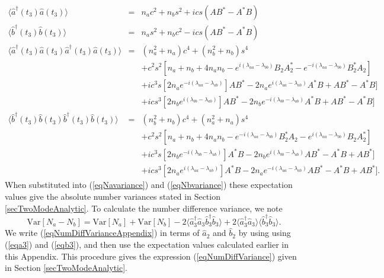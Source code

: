 \documentclass{iopart}
\begin{document}
\begin{eqnarray}
\langle \hat{a}^{\dagger}(t_3) \hat{a}(t_3) \rangle &=& n_a c^2 + n_b s^2 + i c s (A B^* - A^* B) \\
%
\langle \hat{b}^{\dagger}(t_3) \hat{b}(t_3) \rangle &=& n_a s^2 + n_b c^2 - i c s (A B^* - A^* B) \\
%
\langle \hat{a}^{\dagger}(t_3) \hat{a}(t_3) \hat{a}^{\dagger}(t_3)  \hat{a}(t_3) \rangle &=& (n_a^2 + n_a) c^4 + (n_b^2 + n_b) s^4 \nonumber \\
&& + c^2 s^2 [n_a +n_b +4 n_a n_b - e^{i(\lambda_{aa}-\lambda_{bb})} B_2 A_2^* - e^{-i(\lambda_{aa}-\lambda_{bb})} B_2^* A_2] \nonumber \\
&& + i c^3 s [2 n_a e^{-i(\lambda_{aa}-\lambda_{ab})}] A B^* - 2 n_a e^{i(\lambda_{aa}-\lambda_{ab})} A^* B + A B^* - A^* B] \nonumber \\
&& + i c s^3 [2 n_b e^{i(\lambda_{bb}-\lambda_{ab})}] A B^* - 2 n_b e^{-i(\lambda_{bb}-\lambda_{ab})} A^* B + A B^* - A^* B] \\
%
\langle \hat{b}^{\dagger}(t_3)  \hat{b}(t_3) \hat{b}^{\dagger}(t_3)  \hat{b}(t_3) \rangle &=& (n_b^2 + n_b) c^4 + (n_a^2 + n_a) s^4 \nonumber \\
&& + c^2 s^2 [n_a +n_b +4 n_a n_b - e^{-i(\lambda_{aa}-\lambda_{bb})} B_2^* A_2 - e^{i(\lambda_{aa}-\lambda_{bb})} B_2 A_2^*] \nonumber \\
&& + i c^3 s [2 n_b e^{-i(\lambda_{bb}-\lambda_{ab})}] A^* B - 2 n_b e^{i(\lambda_{bb}-\lambda_{ab})} A B^* - A^* B + A B^*] \nonumber \\
&& + i c s^3 [2 n_a e^{i(\lambda_{aa}-\lambda_{ab})}] A^* B - 2 n_a e^{-i(\lambda_{aa}-\lambda_{ab})} A B^* - A^* B + A B^*]. 
\end{eqnarray}
When substituted into (\ref{eqNavariance}) and (\ref{eqNbvariance}) these expectation values give the absolute number variances stated in Section \ref{secTwoModeAnalytic}. To calculate the number difference variance, we note
\begin{equation}
{\mathrm{Var}}[N_a-N_b] = {\mathrm{Var}}[N_a] + {\mathrm{Var}}[N_b] - 2\langle \hat{a}^{\dagger}_3 \hat{a}_3 \hat{b}^{\dagger}_3 \hat{b}_3\rangle + 2\langle \hat{a}^{\dagger}_3  \hat{a}_3 \rangle \langle \hat{b}^{\dagger}_3 \hat{b}_3\rangle \label{eqNumDiffVarianceAppendix}.
\end{equation}
We write (\ref{eqNumDiffVarianceAppendix}) in terms of $\hat{a}_2$ and $\hat{b}_2$ by using using (\ref{eqa3}) and (\ref{eqb3}), and then use the expectation values calculated earlier in this Appendix. This procedure gives the expression (\ref{eqNumDiffVariance}) given in Section \ref{secTwoModeAnalytic}.
\end{document}
